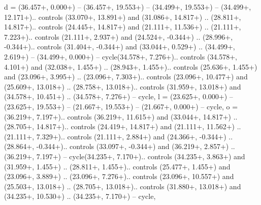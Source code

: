{d} = {(36.457+\ctpXshift, 0.000+\ctpYshift) -- (36.457+\ctpXshift, 19.553+\ctpYshift) -- (34.499+\ctpXshift, 19.553+\ctpYshift) -- (34.499+\ctpXshift, 12.171+\ctpYshift).. controls (33.070+\ctpXshift, 13.891+\ctpYshift) and (31.086+\ctpXshift, 14.817+\ctpYshift) .. (28.811+\ctpXshift, 14.817+\ctpYshift).. controls (24.445+\ctpXshift, 14.817+\ctpYshift) and (21.111+\ctpXshift, 11.536+\ctpYshift) .. (21.111+\ctpXshift, 7.223+\ctpYshift).. controls (21.111+\ctpXshift, 2.937+\ctpYshift) and (24.524+\ctpXshift, -0.344+\ctpYshift) .. (28.996+\ctpXshift, -0.344+\ctpYshift).. controls (31.404+\ctpXshift, -0.344+\ctpYshift) and (33.044+\ctpXshift, 0.529+\ctpYshift) .. (34.499+\ctpXshift, 2.619+\ctpYshift) -- (34.499+\ctpXshift, 0.000+\ctpYshift) -- cycle(34.578+\ctpXshift, 7.276+\ctpYshift).. controls (34.578+\ctpXshift, 4.101+\ctpYshift) and (32.038+\ctpXshift, 1.455+\ctpYshift) .. (28.943+\ctpXshift, 1.455+\ctpYshift).. controls (25.636+\ctpXshift, 1.455+\ctpYshift) and (23.096+\ctpXshift, 3.995+\ctpYshift) .. (23.096+\ctpXshift, 7.303+\ctpYshift).. controls (23.096+\ctpXshift, 10.477+\ctpYshift) and (25.609+\ctpXshift, 13.018+\ctpYshift) .. (28.758+\ctpXshift, 13.018+\ctpYshift).. controls (31.959+\ctpXshift, 13.018+\ctpYshift) and (34.578+\ctpXshift, 10.451+\ctpYshift) .. (34.578+\ctpXshift, 7.276+\ctpYshift) -- cycle},
{l} = {(23.625+\ctpXshift, 0.000+\ctpYshift) -- (23.625+\ctpXshift, 19.553+\ctpYshift) -- (21.667+\ctpXshift, 19.553+\ctpYshift) -- (21.667+\ctpXshift, 0.000+\ctpYshift) -- cycle},
{o} = {(36.219+\ctpXshift, 7.197+\ctpYshift).. controls (36.219+\ctpXshift, 11.615+\ctpYshift) and (33.044+\ctpXshift, 14.817+\ctpYshift) .. (28.705+\ctpXshift, 14.817+\ctpYshift).. controls (24.419+\ctpXshift, 14.817+\ctpYshift) and (21.111+\ctpXshift, 11.562+\ctpYshift) .. (21.111+\ctpXshift, 7.329+\ctpYshift).. controls (21.111+\ctpXshift, 2.884+\ctpYshift) and (24.366+\ctpXshift, -0.344+\ctpYshift) .. (28.864+\ctpXshift, -0.344+\ctpYshift).. controls (33.097+\ctpXshift, -0.344+\ctpYshift) and (36.219+\ctpXshift, 2.857+\ctpYshift) .. (36.219+\ctpXshift, 7.197+\ctpYshift) -- cycle(34.235+\ctpXshift, 7.170+\ctpYshift).. controls (34.235+\ctpXshift, 3.863+\ctpYshift) and (31.959+\ctpXshift, 1.455+\ctpYshift) .. (28.811+\ctpXshift, 1.455+\ctpYshift).. controls (25.477+\ctpXshift, 1.455+\ctpYshift) and (23.096+\ctpXshift, 3.889+\ctpYshift) .. (23.096+\ctpXshift, 7.276+\ctpYshift).. controls (23.096+\ctpXshift, 10.557+\ctpYshift) and (25.503+\ctpXshift, 13.018+\ctpYshift) .. (28.705+\ctpXshift, 13.018+\ctpYshift).. controls (31.880+\ctpXshift, 13.018+\ctpYshift) and (34.235+\ctpXshift, 10.530+\ctpYshift) .. (34.235+\ctpXshift, 7.170+\ctpYshift) -- cycle},
